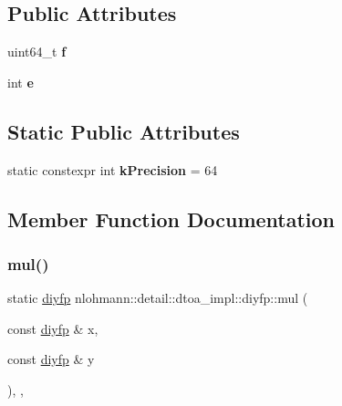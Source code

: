 \subsection*{Public Attributes}
\begin{DoxyCompactItemize}
\item 
\mbox{\label{structnlohmann_1_1detail_1_1dtoa__impl_1_1diyfp_a90f04c892ac1e707fdb50b0e1eb59030}} 
uint64\+\_\+t {\bfseries f}
\item 
\mbox{\label{structnlohmann_1_1detail_1_1dtoa__impl_1_1diyfp_ae22e170815983961447c429f324c944d}} 
int {\bfseries e}
\end{DoxyCompactItemize}
\subsection*{Static Public Attributes}
\begin{DoxyCompactItemize}
\item 
\mbox{\label{structnlohmann_1_1detail_1_1dtoa__impl_1_1diyfp_a03682754b06ed4f30b263119eecc2d52}} 
static constexpr int {\bfseries k\+Precision} = 64
\end{DoxyCompactItemize}


\subsection{Member Function Documentation}
\mbox{\label{structnlohmann_1_1detail_1_1dtoa__impl_1_1diyfp_aa5f250d12ce89c81fdb08900c6a823e8}} 
\subsubsection{\texorpdfstring{mul()}{mul()}}
{\footnotesize\ttfamily static \mbox{\hyperlink{structnlohmann_1_1detail_1_1dtoa__impl_1_1diyfp}{diyfp}} nlohmann\+::detail\+::dtoa\+\_\+impl\+::diyfp\+::mul (\begin{DoxyParamCaption}\item[{const \mbox{\hyperlink{structnlohmann_1_1detail_1_1dtoa__impl_1_1diyfp}{diyfp}} \&}]{x,  }\item[{const \mbox{\hyperlink{structnlohmann_1_1detail_1_1dtoa__impl_1_1diyfp}{diyfp}} \&}]{y }\end{DoxyParamCaption})\hspace{0.3cm}{\ttfamily [inline]}, {\ttfamily [static]}, {\ttfamily [noexcept]}}



